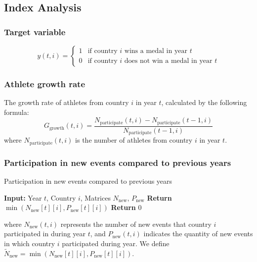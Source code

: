 \documentclass{mcmthesis}
\begin{document}
	
	\subsection{Index Analysis}
	
	
	\subsubsection{Target variable}
	\[
	y(t,i) = 
	\begin{cases} 
		1 & \text{if country } i \text{ wins a medal in year } t \\ 
		0 & \text{if country } i \text{ does not win a medal in year } t 
	\end{cases}
	\]
	\subsubsection{Athlete growth rate}
	The growth rate of athletes from country $i$ in year $t$, calculated by the following formula:
	\[
	G_{\text{growth}}(t,i) = \frac{N_{\text{participate}}(t,i) - N_{\text{participate}}(t-1,i)}{N_{\text{participate}}(t-1,i)}
	\]
	where $N_{\text{participate}}(t,i)$ is the number of athletes from country $i$ in year $t$.
	
	
	\subsubsection{Participation in new events compared to previous years} 
	\begin{algorithm}
		\caption{Participation in new events compared to previous years}
		\begin{algorithmic}[1]
			\State \textbf{Input:} Year \( t \), Country \( i \), Matrices \( N_{\text{new}} \), \( P_{\text{new}} \)
			\State \textbf{Return} $\min(N_{\text{new}}[t][i], P_{\text{new}}[t][i])$
			\EndIf
			\EndFor
			\State \textbf{Return} 0
		\end{algorithmic}
	\end{algorithm}
	
	where \( N_{\text{new}}(t,i) \) represents the number of new events that country \( i \) participated in during year \( t \), and \( P_{\text{new}}(t,i) \) indicates the quantity of new events in which country \(i\) participated during year. We define \( \tilde{N}_{\text{new}} = \min(N_{\text{new}}[t][i], P_{\text{new}}[t][i]) \).
	
\end{document}

